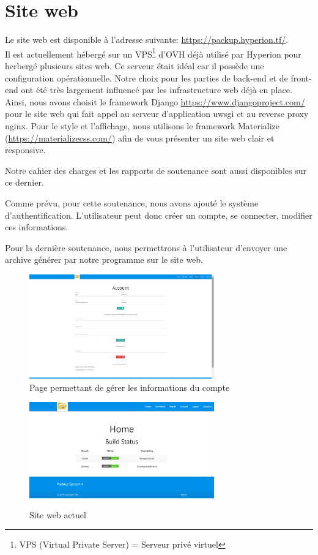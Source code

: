 	
    
\newpage

\section{Site web}

    Le site web est disponible à l'adresse suivante: \url{https://packup.hyperion.tf/}. \\
    Il est actuellement hébergé sur un VPS\footnote{VPS (Virtual Private Server) = Serveur privé virtuel} d'OVH déjà utilisé par Hyperion pour herbergé plusieurs sites web. Ce serveur était idéal car il possède une configuration opérationnelle. Notre choix pour les parties de back-end et de front-end ont été très largement influencé par les infrastructure web déjà en place. Ainsi, nous avons choisit le framework Django \url{https://www.djangoproject.com/} pour le site web qui fait appel au serveur d'application uwsgi et au reverse proxy nginx.
    Pour le style et l'affichage, nous utilisons le framework Materialize (\url{https://materializecss.com/}) afin de vous présenter un site web clair et responsive.

    Notre cahier des charges et les rapports de soutenance sont aussi disponibles sur ce dernier.
    
    Comme prévu, pour cette soutenance, nous avons ajouté le système d'authentification.
    L'utilisateur peut donc créer un compte, se connecter, modifier ces informations.
    
    Pour la dernière soutenance, nous permettrons à l'utilisateur d'envoyer une archive générer par notre programme sur le site web.
    \begin{figure}[!h]
		\centering
		\includegraphics[width=8cm]{images/website-account.png}
		\caption{Page permettant de gérer les informations du compte}
		\label{Site web actuel}
	\end{figure}
    
    \begin{figure}[!h]
		\centering
		\includegraphics[width=8cm]{images/website.png}
		\caption{Site web actuel}
		\label{Site web actuel}
	\end{figure}

